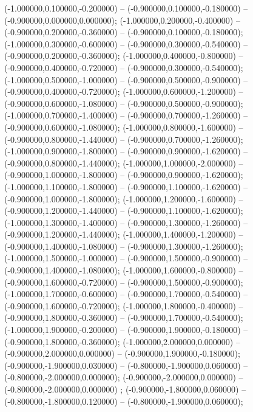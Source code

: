  (-1.000000,0.100000,-0.200000) -- (-0.900000,0.100000,-0.180000) -- (-0.900000,0.000000,0.000000);
 (-1.000000,0.200000,-0.400000) -- (-0.900000,0.200000,-0.360000) -- (-0.900000,0.100000,-0.180000);
 (-1.000000,0.300000,-0.600000) -- (-0.900000,0.300000,-0.540000) -- (-0.900000,0.200000,-0.360000);
 (-1.000000,0.400000,-0.800000) -- (-0.900000,0.400000,-0.720000) -- (-0.900000,0.300000,-0.540000);
 (-1.000000,0.500000,-1.000000) -- (-0.900000,0.500000,-0.900000) -- (-0.900000,0.400000,-0.720000);
 (-1.000000,0.600000,-1.200000) -- (-0.900000,0.600000,-1.080000) -- (-0.900000,0.500000,-0.900000);
 (-1.000000,0.700000,-1.400000) -- (-0.900000,0.700000,-1.260000) -- (-0.900000,0.600000,-1.080000);
 (-1.000000,0.800000,-1.600000) -- (-0.900000,0.800000,-1.440000) -- (-0.900000,0.700000,-1.260000);
 (-1.000000,0.900000,-1.800000) -- (-0.900000,0.900000,-1.620000) -- (-0.900000,0.800000,-1.440000);
 (-1.000000,1.000000,-2.000000) -- (-0.900000,1.000000,-1.800000) -- (-0.900000,0.900000,-1.620000);
 (-1.000000,1.100000,-1.800000) -- (-0.900000,1.100000,-1.620000) -- (-0.900000,1.000000,-1.800000);
 (-1.000000,1.200000,-1.600000) -- (-0.900000,1.200000,-1.440000) -- (-0.900000,1.100000,-1.620000);
 (-1.000000,1.300000,-1.400000) -- (-0.900000,1.300000,-1.260000) -- (-0.900000,1.200000,-1.440000);
 (-1.000000,1.400000,-1.200000) -- (-0.900000,1.400000,-1.080000) -- (-0.900000,1.300000,-1.260000);
 (-1.000000,1.500000,-1.000000) -- (-0.900000,1.500000,-0.900000) -- (-0.900000,1.400000,-1.080000);
 (-1.000000,1.600000,-0.800000) -- (-0.900000,1.600000,-0.720000) -- (-0.900000,1.500000,-0.900000);
 (-1.000000,1.700000,-0.600000) -- (-0.900000,1.700000,-0.540000) -- (-0.900000,1.600000,-0.720000);
 (-1.000000,1.800000,-0.400000) -- (-0.900000,1.800000,-0.360000) -- (-0.900000,1.700000,-0.540000);
 (-1.000000,1.900000,-0.200000) -- (-0.900000,1.900000,-0.180000) -- (-0.900000,1.800000,-0.360000);
 (-1.000000,2.000000,0.000000) -- (-0.900000,2.000000,0.000000) -- (-0.900000,1.900000,-0.180000);
 (-0.900000,-1.900000,0.030000) -- (-0.800000,-1.900000,0.060000) -- (-0.800000,-2.000000,0.000000);
 (-0.900000,-2.000000,0.000000) -- (-0.800000,-2.000000,0.000000) ;
 (-0.900000,-1.800000,0.060000) -- (-0.800000,-1.800000,0.120000) -- (-0.800000,-1.900000,0.060000);
